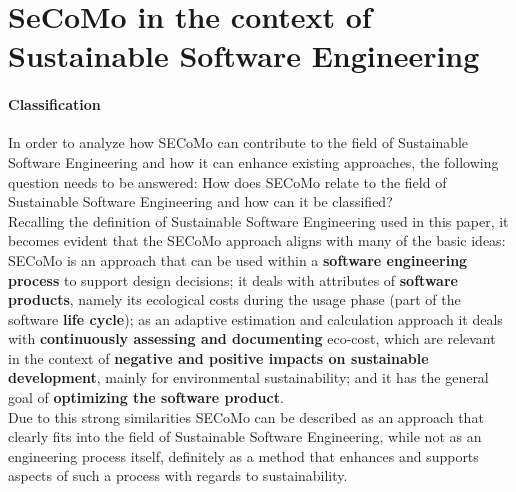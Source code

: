 
\section{SeCoMo in the context of Sustainable Software Engineering}
\paragraph{Classification}
In order to analyze how SECoMo can contribute to the field of Sustainable Software Engineering and how it can enhance existing approaches, the following question needs to be answered: How does SECoMo relate to the field of Sustainable Software Engineering and how can it be classified?\\
Recalling the definition of Sustainable Software Engineering %
 used in this paper, it becomes evident that the SECoMo approach aligns with many of the basic ideas: SECoMo is an approach that can be used within a \textbf{software engineering process} to support design decisions; it deals with attributes of \textbf{software products}, namely its ecological costs during the usage phase (part of the software \textbf{life cycle}); as an adaptive estimation and calculation approach it deals with \textbf{continuously assessing and documenting} eco-cost, which are relevant in the context of \textbf{negative and positive impacts on sustainable development}, mainly for environmental sustainability; and it has the general goal of \textbf{optimizing the software product}.\\
Due to this strong similarities SECoMo can be described as an approach that clearly fits into the field of Sustainable Software Engineering, while not as an engineering process itself, definitely as a method that enhances and supports aspects of such a process with regards to sustainability.\\
